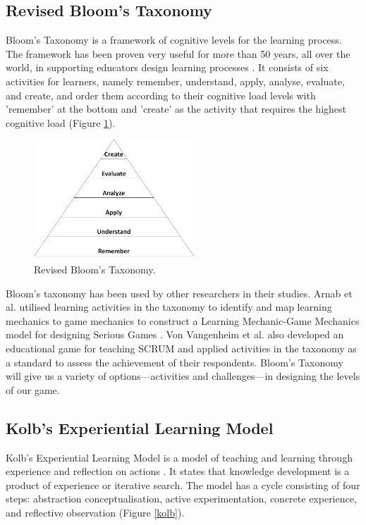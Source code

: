 \documentclass[12pt, a4paper]{report}
\begin{document}
\subsection{Revised Bloom's Taxonomy}
Bloom's Taxonomy \cite{krathwohl2002revision} is a framework of cognitive levels for the learning process. The framework has been proven very useful for more than 50 years, all over the world, in supporting educators design learning processes \cite{munzenmaier2013bloom}. It consists of six activities for learners, namely remember, understand, apply, analyse, evaluate, and create, and order them according to their cognitive load levels with 'remember' at the bottom and 'create' as the activity that requires the highest cognitive load (Figure \ref{bloom}). 

\begin{figure}[ht]
\centering
\includegraphics[width=6cm]{bloom}
\caption{Revised Bloom's Taxonomy\cite{krathwohl2002revision}.}
\label{bloom}
\end{figure}

Bloom's taxonomy has been used by other researchers in their studies. Arnab et al. utilised learning activities in the taxonomy to identify and map learning mechanics to game mechanics to construct a Learning Mechanic-Game Mechanics model for designing Serious Games \cite{arnab2015mapping}. Von Vangenheim et al. \cite{von2013scrumia} also developed an educational game for teaching SCRUM and applied activities in the taxonomy as a standard to assess the achievement of their respondents. Bloom's Taxonomy will give us a variety of options---activities and challenges---in designing the levels of our game.

\subsection{Kolb's Experiential Learning Model}
Kolb's Experiential Learning Model is a model of teaching and learning through experience and reflection on actions \cite{kolb2014experiential}. It states that knowledge development is a product of experience or iterative search. The model has a cycle consisting of four steps: abstraction conceptualisation, active experimentation, concrete experience, and reflective observation (Figure \ref{kolb}). 
\end{document}
